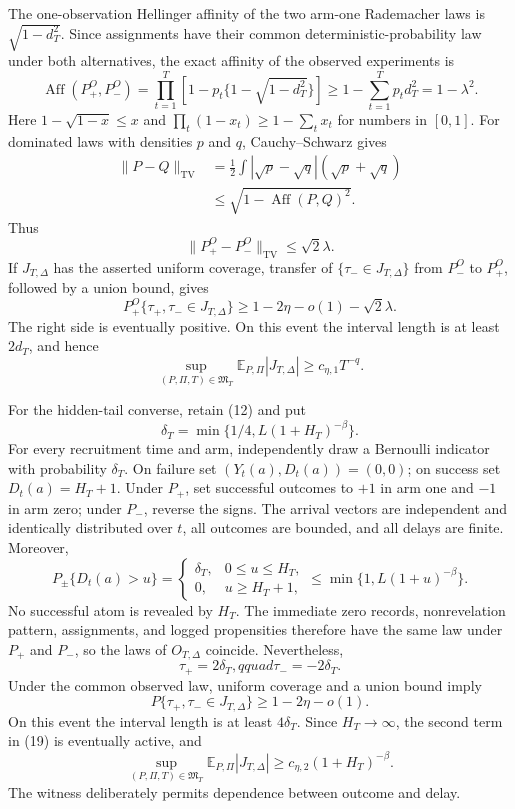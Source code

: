The one-observation Hellinger affinity of the two arm-one Rademacher laws is \(\sqrt{1-d_T^2}\).  Since assignments have their common deterministic-probability law under both alternatives, the exact affinity of the observed experiments is
\[
 \operatorname{Aff}(P_+^O,P_-^O)
 =\prod_{t=1}^T\left[1-p_t\{1-\sqrt{1-d_T^2}\}\right]
 \geq1-\sum_{t=1}^Tp_td_T^2=1-\lambda^2. \tag{14}
\]
Here \(1-\sqrt{1-x}\leq x\) and \(\prod_t(1-x_t)\geq1-\sum_tx_t\) for numbers in \([0,1]\).  For dominated laws with densities \(p\) and \(q\), Cauchy--Schwarz gives
\[
 \begin{aligned}
 \|P-Q\|_{\mathrm{TV}}
 &=\frac12\int|\sqrt p-\sqrt q|(\sqrt p+\sqrt q)\\
 &\leq\sqrt{1-\operatorname{Aff}(P,Q)^2}.
 \end{aligned} \tag{15}
\]
Thus
\[
 \|P_+^O-P_-^O\|_{\mathrm{TV}}\leq\sqrt2\lambda. \tag{16}
\]
If \(J_{T,\Delta}\) has the asserted uniform coverage, transfer of \(\{\tau_-\in J_{T,\Delta}\}\) from \(P_-^O\) to \(P_+^O\), followed by a union bound, gives
\[
 P_+^O\{\tau_+,\tau_-\in J_{T,\Delta}\}
 \geq1-2\eta-o(1)-\sqrt2\lambda. \tag{17}
\]
The right side is eventually positive.  On this event the interval length is at least \(2d_T\), and hence
\[
 \sup_{(P,\Pi,T)\in\mathfrak M_T}
 \mathbb E_{P,\Pi}|J_{T,\Delta}|\geq c_{\eta,1}T^{-q}. \tag{18}
\]

For the hidden-tail converse, retain (12) and put
\[
 \delta_T=\min\{1/4,L(1+H_T)^{-\beta}\}. \tag{19}
\]
For every recruitment time and arm, independently draw a Bernoulli indicator with probability \(\delta_T\).  On failure set \((Y_t(a),D_t(a))=(0,0)\); on success set \(D_t(a)=H_T+1\).  Under \(P_+\), set successful outcomes to \(+1\) in arm one and \(-1\) in arm zero; under \(P_-\), reverse the signs.  The arrival vectors are independent and identically distributed over \(t\), all outcomes are bounded, and all delays are finite.  Moreover,
\[
 P_\pm\{D_t(a)>u\}=
 \begin{cases}
 \delta_T,&0\leq u\leq H_T,\\
 0,&u\geq H_T+1,
 \end{cases}
 \leq\min\{1,L(1+u)^{-\beta}\}. \tag{20}
\]
No successful atom is revealed by \(H_T\).  The immediate zero records, nonrevelation pattern, assignments, and logged propensities therefore have the same law under \(P_+\) and \(P_-\), so the laws of \(O_{T,\Delta}\) coincide.  Nevertheless,
\[
 \tau_+=2\delta_T,qquad \tau_-=-2\delta_T. \tag{21}
\]
Under the common observed law, uniform coverage and a union bound imply
\[
 P\{\tau_+,\tau_-\in J_{T,\Delta}\}\geq1-2\eta-o(1). \tag{22}
\]
On this event the interval length is at least \(4\delta_T\).  Since \(H_T\to\infty\), the second term in (19) is eventually active, and
\[
 \sup_{(P,\Pi,T)\in\mathfrak M_T}
 \mathbb E_{P,\Pi}|J_{T,\Delta}|\geq c_{\eta,2}(1+H_T)^{-\beta}. \tag{23}
\]
The witness deliberately permits dependence between outcome and delay.

